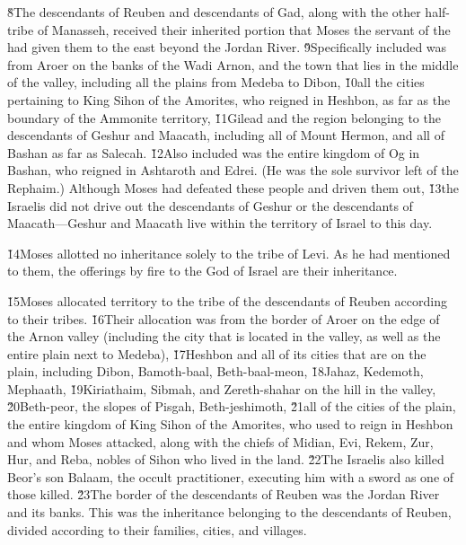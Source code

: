 \v{8}The descendants of Reuben and descendants of Gad, along with the other half-tribe of Manasseh, received their inherited portion that Moses the servant of the  had given them to the east beyond the Jordan River. \v{9}Specifically included was from Aroer on the banks of the Wadi Arnon, and the town that lies in the middle of the valley, including all the plains from Medeba to Dibon, \v{10}all the cities pertaining to King Sihon of the Amorites, who reigned in Heshbon, as far as the boundary of the Ammonite territory, \v{11}Gilead and the region belonging to the descendants of Geshur and Maacath, including all of Mount Hermon, and all of Bashan as far as Salecah. \v{12}Also included was the entire kingdom of Og in Bashan, who reigned in Ashtaroth and Edrei. (He was the sole survivor left of the Rephaim.) Although Moses had defeated these people and driven them out, \v{13}the Israelis did not drive out the descendants of Geshur or the descendants of Maacath---Geshur and Maacath live within the territory of Israel to this day.

\v{14}Moses allotted no inheritance solely to the tribe of Levi. As he had mentioned to them, the offerings by fire to the  God of Israel are their inheritance.

\v{15}Moses allocated territory to the tribe of the descendants of Reuben according to their tribes. \v{16}Their allocation was from the border of Aroer on the edge of the Arnon valley (including the city that is located in the valley, as well as the entire plain next to Medeba), \v{17}Heshbon and all of its cities that are on the plain, including Dibon, Bamoth-baal, Beth-baal-meon, \v{18}Jahaz, Kedemoth, Mephaath, \v{19}Kiriathaim, Sibmah, and Zereth-shahar on the hill in the valley, \v{20}Beth-peor, the slopes of Pisgah, Beth-jeshimoth, \v{21}all of the cities of the plain, the entire kingdom of King Sihon of the Amorites, who used to reign in Heshbon and whom Moses attacked, along with the chiefs of Midian, Evi, Rekem, Zur, Hur, and Reba, nobles of Sihon who lived in the land. \v{22}The Israelis also killed Beor's son Balaam, the occult practitioner, executing him with a sword as one of those killed. \v{23}The border of the descendants of Reuben was the Jordan River and its banks. This was the inheritance belonging to the descendants of Reuben, divided according to their families, cities, and villages.


